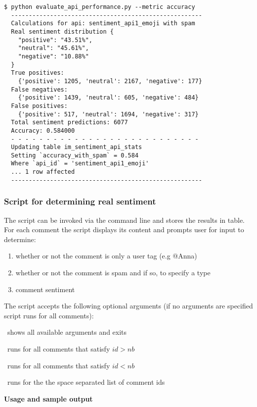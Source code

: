\begin{Verbatim}[formatcom=\color{darkgray},fontfamily=courier]
$ python evaluate_api_performance.py --metric accuracy 
  ------------------------------------------------------
  Calculations for api: sentiment_api1_emoji with spam
  Real sentiment distribution {
    "positive": "43.51%", 
    "neutral": "45.61%", 
    "negative": "10.88%"
  }
  True positives: 
    {'positive': 1205, 'neutral': 2167, 'negative': 177} 
  False negatives: 
    {'positive': 1439, 'neutral': 605, 'negative': 484} 
  False positives: 
    {'positive': 517, 'neutral': 1694, 'negative': 317} 
  Total sentiment predictions: 6077 
  Accuracy: 0.584000 
  - - - - - - - - - - - - - - - - - - - - - - - - - - - 
  Updating table im_sentiment_api_stats
  Setting `accuracy_with_spam` = 0.584 
  Where `api_id` = 'sentiment_api1_emoji' 
  ... 1 row affected
  ------------------------------------------------------
\end{Verbatim}


\subsubsection*{Script for determining real sentiment}
\noindent The \emph{} script can be invoked via the command line and stores the results in  table.
For each comment the script displays its content and prompts user for input to determine: 
 \begin{enumerate}
  \item whether or not the comment is only a user tag (e.g @Anna)
  \item whether or not the comment is spam and if so, to specify a type
  \item comment sentiment
\end{enumerate}
The script accepts the following optional arguments (if no arguments are specified script runs for all comments):
\begin{description}[labelindent=0.7cm, leftmargin=1.7cm]
\singlespacing
 \item[--help -h ] shows all available arguments and exits
 \item[-idgt \textless nb\textgreater] runs for all comments that satisfy $id > nb$
 \item[-idlt \textless nb\textgreater] runs for all comments that satisfy $id < nb$
 \item[-ideq \textless nb nb\textgreater ] runs for the the space separated list of comment ids
\end{description}
\textbf{Usage and sample output}

